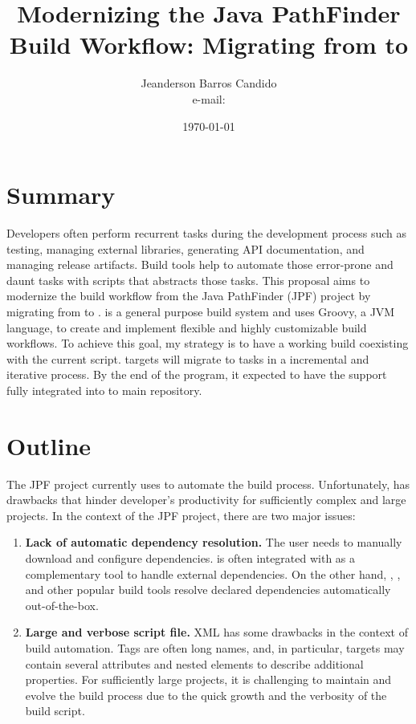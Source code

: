 \documentclass{article}
\author{Jeanderson Barros Candido\\ e-mail: \email{jeandersonbc@gmail.com}}
\title{Modernizing the Java PathFinder Build Workflow: Migrating from \ant{} to
\gradle{}}
\date{\today}
\begin{document}
\maketitle

\section{Summary}

Developers often perform recurrent tasks during the development process such
as testing, managing external libraries, generating API documentation, and
managing release artifacts.
Build tools help to automate those error-prone and daunt tasks with scripts
that abstracts those tasks.
This proposal aims to modernize the build workflow from the Java PathFinder
(JPF) project by migrating from \ant{} to \gradle{}.
\gradle{} is a general purpose build system and uses Groovy, a JVM language, to
create and implement flexible and highly customizable build workflows.
To achieve this goal, my strategy is to have a working \gradle{} build
coexisting with the current \ant{} script.
\ant{} targets will migrate to \gradle{} tasks in a incremental and
iterative process.
By the end of the program, it expected to have the \gradle{} support fully
integrated into to main repository.

\section{Outline}
\label{sec:intro}

The JPF project currently uses \ant{} to automate the build process.
Unfortunately, \ant{} has drawbacks that hinder developer's productivity for
sufficiently complex and large projects.
In the context of the JPF project, there are two major issues:

\begin{enumerate}

\item \textbf{Lack of automatic dependency resolution.}
The user needs to manually download and configure dependencies.
\ant{} is often integrated with \ivy{}\cite{page:ivy} as a complementary
tool to handle external dependencies.
On the other hand, \gradle{}\cite{page:gradle}, \maven{}\cite{page:maven},
and other popular build tools resolve declared dependencies automatically
out-of-the-box.

\item \textbf{Large and verbose script file.}
XML has some drawbacks in the context of build automation.
Tags are often long names, and, in particular, \ant{} targets may
contain several attributes and nested elements to describe additional
properties.
For sufficiently large projects, it is challenging to maintain and evolve the
build process due to the quick growth and the verbosity of the build script.

\end{enumerate}
\end{document}
